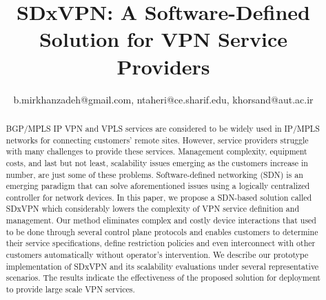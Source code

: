 \documentclass[10pt,conference]{IEEEtran}
\begin{document}
\title{SDxVPN:   A Software-Defined Solution for  VPN Service  Providers}





\author{
 b.mirkhanzadeh@gmail.com,
ntaheri@ce.sharif.edu, khorsand@aut.ac.ir}















\maketitle


\begin{abstract}
BGP/MPLS IP VPN and VPLS services are considered to be widely used in IP/MPLS networks for 
connecting customers' remote sites. However, service providers struggle with many challenges to provide these services.   Management complexity, equipment costs, and last but not least, scalability issues emerging as the customers increase in number, are just some of these problems. Software-defined networking (SDN) is an emerging paradigm that can solve aforementioned issues using a logically  centralized controller for network devices.
In this paper, we propose a SDN-based solution called SDxVPN which considerably 
lowers the complexity of  VPN service definition and management. Our method eliminates complex and costly device interactions that used to  be done through several control plane protocols and enables customers to determine 
their service specifications, define  restriction policies and even ‌interconnect with other
customers automatically without operator's intervention. We describe
our prototype implementation of SDxVPN and its scalability evaluations under several representative
scenarios. The results indicate the effectiveness of the proposed solution for deployment to provide
large scale VPN services.\end{abstract}
\end{document}
